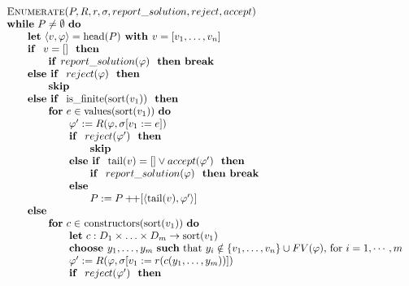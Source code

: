 \documentclass{article}
\newcommand{\concat}{\ensuremath{+\!\!+}}
\begin{document}
\[
\begin{tabular}{l}
\textsc{Enumerate}($P,R,r,\sigma, report\_solution, reject, accept)$ \\
\textbf{while} $P\neq \emptyset $ \textbf{do} \\
\qquad \textbf{let} $\left\langle v,\varphi \right\rangle =\mathrm{head}(P) 
\textbf{ with } v = [v_1, \ldots, v_n]$\\
\qquad \textbf{if } $v = []$ \textbf{ then} \\
\qquad \qquad \textbf{if }$report\_solution(\varphi)$ \textbf{ then break} \\
\qquad \textbf{else if } $reject(\varphi)$ \textbf{ then} \\
\qquad \qquad \textbf{skip} \\
\qquad \textbf{else if } $\mathrm{is\_finite}(\mathrm{sort}(v_{1}))$ \textbf{ then} \\
\qquad \qquad \textbf{for} $e\in \mathrm{values}(\mathrm{sort}(v_{1}))$ \textbf{do} \\
\qquad \qquad \qquad $\varphi^{\prime}:=R(\varphi,\sigma[v_{1}:=e])$ \\
\qquad \qquad \qquad \textbf{if } $reject(\varphi')$ \textbf{ then} \\
\qquad \qquad \qquad \qquad \textbf{skip} \\
\qquad \qquad \qquad \textbf{else if } $\mathrm{tail}(v) = [] \vee accept(\varphi')$ \textbf{ then} \\
\qquad \qquad \qquad \qquad \textbf{if } $report\_solution(\varphi)$ \textbf{ then break} \\
\qquad \qquad \qquad \textbf{else } \\ 
\qquad \qquad \qquad \qquad $P:=P\concat\lbrack \left\langle \mathrm{tail}(v), \varphi' \right\rangle ]$ \\
\qquad \textbf{else } \\
\qquad \qquad \textbf{for} $c\in $ $\mathrm{constructors}(\mathrm{sort}(v_{1}))$ \textbf{do} \\
\qquad \qquad \qquad \textbf{let} $c:D_{1}\times \ldots \times
D_{m}\rightarrow \mathrm{sort}(v_{1})$ \\
\qquad \qquad \qquad \textbf{choose }$y_1,\ldots ,y_m$
\textbf{such} that $y_i \notin \{ v_1, \ldots ,v_n \} \cup FV(\varphi)$, for $i=1, \cdots, m$ \\
\qquad \qquad \qquad $\varphi ^{\prime }:=R(\varphi ,\sigma \lbrack v_{1}:=r(c(y_{1},\ldots ,y_{m}))])$ \\
\qquad \qquad \qquad \textbf{if } $reject(\varphi')$ \textbf{ then} \\

\end{tabular}\]
\end{document}

